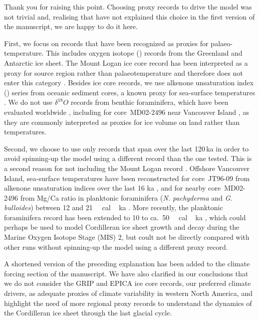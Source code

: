 Thank you for raising this point. Choosing proxy records to drive the model
was not trivial and, realising that have not explained this choice in the
first version of the manuscript, we are happy to do it here.

First, we focus on records that have been recognized as proxies for
palaeo-temperature. This includes oxygen isotope () records
from the Greenland and Antarctic ice sheet. The Mount Logan ice core
 record has been interpreted as a proxy for source region
rather than palaeotemperature and therefore does not enter this category
\citep{Fisher.etal.2004, Fisher.etal.2008}. Besides ice core records, we use
alkenone unsaturation index () series from oceanic sediment
cores, a known proxy for sea-surface temperatures \citep{Prahl.Wakeham.1987,
Prahl.etal.1988,Muller.etal.1998}. We do not use $\delta^{18}O$ records from
benthic foraminifera, which have been evaluated worldwide
\citep{Lisiecki.Raymo.2005}, including for core~MD02-2496 near Vancouver Island
\citep{Cosma.etal.2008}, as they are commonly interpreted as proxies for ice
volume on land \citep{Shackleton.1967} rather than temperatures.

Second, we choose to use only records that span over the last 120\,ka in order
to avoid spinning-up the model using a different record than the one tested.
This is a second reason for not including the Mount Logan 
record \citep{Fisher.etal.2004}. Offshore Vancouver Island,
sea-surface temperatures have been reconstructed for core~JT96-09 from alkenone
unsaturation indices over the last 16 ka \citep{Kienast.McKay.2001}, and for nearby
core~MD02-2496 from Mg/Ca ratio in planktonic foraminifera (\emph{N. pachyderma}
and \emph{G. bulloides}) between 12 and 21\,\unit{\,cal\,ka}
\citep{Taylor.etal.2014}. More recently, the planktonic foraminifera record has
been extended to 10 to ca.~50\,\unit{\,cal\,ka}
\citep{Taylor.etal.2015}, which could perhaps be used to model Cordilleran ice
sheet growth and decay during the Marine Oxygen Isotope Stage (MIS) 2, but
coult not be directly compared with other runs without spinning-up the model
using a different proxy record.

A shortened version of the preceding explanation has been added to the climate
forcing section of the manuscript. We have also clarified in our conclusions
that we do not consider the GRIP and EPICA ice core records, our preferred
climate drivers, as adequate proxies of climate variability in western North
America, and highlight the need of more regional proxy records to understand
the dynamics of the Cordilleran ice sheet through the last glacial cycle.

